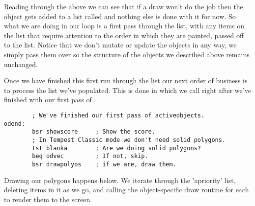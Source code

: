 Reading through the above we can see that if a  draw won't do the job then the object gets
added to a list called  and nothing else is done with it for now. So what we are doing in our
 loop is a first pass through the  list, with any items on the list that 
require attention to the order in which they are painted, passed off to the  list. Notice
that we don't mutate or update the objects in any way, we simply pass them over so the structure of the objects
we described above remains unchanged.

Once we have finished this first run through the  list our next order of business
is to process the  list we've populated. This is done in  which we
call right after we've finished with our first pass of . 

\begin{lstlisting}
        ; We've finished our first pass of activeobjects.
odend:
        bsr showscore     ; Show the score.
        ; In Tempest Classic mode we don't need solid polygons.
        tst blanka        ; Are we doing solid polygons?
        beq odvec         ; If not, skip.
        bsr drawpolyos    ; if we are, draw them.
\end{lstlisting}

Drawing our polygons happens below. We iterate through the 'apriority' list, deleting items in it
as we go, and calling the object-specific draw routine for each to render them to the screen.

